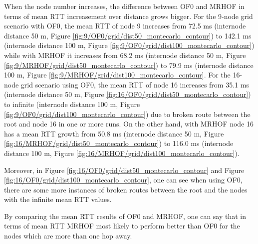 When the node number increases, the difference between OF0 and MRHOF in terms of mean RTT increasement over distance grows bigger. For the 9-node grid scenario with OF0, the mean RTT of node 9 increases from 72.5 ms (internode distance 50 m, Figure \ref{fig:9/OF0/grid/dist50_montecarlo_contour}) to 142.1 ms (internode distance 100 m, Figure \ref{fig:9/OF0/grid/dist100_montecarlo_contour}) while with MRHOF it increases from 68.2 ms (internode distance 50 m, Figure \ref{fig:9/MRHOF/grid/dist50_montecarlo_contour}) to 79.9 ms (internode distance 100 m, Figure \ref{fig:9/MRHOF/grid/dist100_montecarlo_contour}. For the 16-node grid scenario using OF0, the mean RTT of node 16 increases from 35.1 ms (internode distance 50 m, Figure \ref{fig:16/OF0/grid/dist50_montecarlo_contour}) to infinite (internode distance 100 m, Figure \ref{fig:9/OF0/grid/dist100_montecarlo_contour}) due to broken route between the root and node 16 in one or more runs. On the other hand, with MRHOF node 16 has a mean RTT growth from 50.8 ms (internode distance 50 m, Figure \ref{fig:16/MRHOF/grid/dist50_montecarlo_contour}) to 116.0 ms (internode distance 100 m, Figure \ref{fig:16/MRHOF/grid/dist100_montecarlo_contour}).
\newline

Moreover, in Figure \ref{fig:16/OF0/grid/dist50_montecarlo_contour} and Figure \ref{fig:16/OF0/grid/dist100_montecarlo_contour}, one can see when using OF0, there are some more instances of broken routes between the root and the nodes with the infinite mean RTT values. 
\newline

By comparing the mean RTT results of OF0 and MRHOF, one can say that in terms of mean RTT MRHOF most likely to perform better than OF0 for the nodes which are more than one hop away. 


